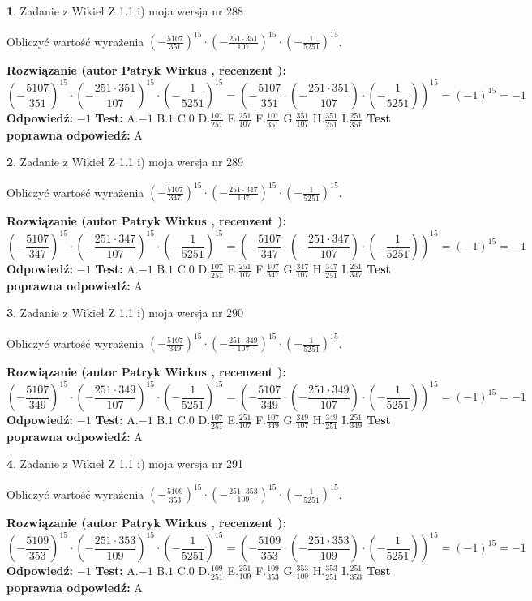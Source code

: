 \documentclass[12pt, a4paper]{article}
\theoremstyle{definition} %
\newtheorem{zad}{}
\newcommand{\zadStart}[1]{\begin{zad}#1\newline}
\newcommand{\zadStop}{\end{zad}}
\newcommand{\rozwStart}[2]{\noindent \textbf{Rozwiązanie (autor #1 , recenzent #2): }\newline}
\newcommand{\rozwStop}{\newline}
\newcommand{\odpStart}{\noindent \textbf{Odpowiedź:}\newline}
\newcommand{\odpStop}{\newline}
\newcommand{\testStart}{\noindent \textbf{Test:}\newline}
\newcommand{\testStop}{\newline}
\newcommand{\kluczStart}{\noindent \textbf{Test poprawna odpowiedź:}\newline}
\newcommand{\kluczStop}{\newline}
\begin{document}
\zadStart{Zadanie z Wikieł Z 1.1 i) moja wersja nr 288}

Obliczyć wartość wyrażenia $(-\frac{5107}{351})^{15} \cdot (-\frac{251 \cdot 351}{107})^{15} \cdot (-\frac{1}{5251})^{15}$.
\zadStop
\rozwStart{Patryk Wirkus}{}
$$(-\frac{5107}{351})^{15} \cdot (-\frac{251 \cdot 351}{107})^{15} \cdot (-\frac{1}{5251})^{15} = (-\frac{5107}{351} \cdot (-\frac{251 \cdot 351}{107}) \cdot (-\frac{1}{5251}))^{15} = (-1)^{15} = -1$$
\rozwStop
\odpStart
$-1$
\odpStop
\testStart
A.$-1$ B.$1$ C.$0$ D.$\frac{107}{251}$ E.$\frac{251}{107}$
F.$\frac{107}{351}$ G.$\frac{351}{107}$
H.$\frac{351}{251}$
I.$\frac{251}{351}$
\testStop
\kluczStart
A
\kluczStop



\zadStart{Zadanie z Wikieł Z 1.1 i) moja wersja nr 289}

Obliczyć wartość wyrażenia $(-\frac{5107}{347})^{15} \cdot (-\frac{251 \cdot 347}{107})^{15} \cdot (-\frac{1}{5251})^{15}$.
\zadStop
\rozwStart{Patryk Wirkus}{}
$$(-\frac{5107}{347})^{15} \cdot (-\frac{251 \cdot 347}{107})^{15} \cdot (-\frac{1}{5251})^{15} = (-\frac{5107}{347} \cdot (-\frac{251 \cdot 347}{107}) \cdot (-\frac{1}{5251}))^{15} = (-1)^{15} = -1$$
\rozwStop
\odpStart
$-1$
\odpStop
\testStart
A.$-1$ B.$1$ C.$0$ D.$\frac{107}{251}$ E.$\frac{251}{107}$
F.$\frac{107}{347}$ G.$\frac{347}{107}$
H.$\frac{347}{251}$
I.$\frac{251}{347}$
\testStop
\kluczStart
A
\kluczStop



\zadStart{Zadanie z Wikieł Z 1.1 i) moja wersja nr 290}

Obliczyć wartość wyrażenia $(-\frac{5107}{349})^{15} \cdot (-\frac{251 \cdot 349}{107})^{15} \cdot (-\frac{1}{5251})^{15}$.
\zadStop
\rozwStart{Patryk Wirkus}{}
$$(-\frac{5107}{349})^{15} \cdot (-\frac{251 \cdot 349}{107})^{15} \cdot (-\frac{1}{5251})^{15} = (-\frac{5107}{349} \cdot (-\frac{251 \cdot 349}{107}) \cdot (-\frac{1}{5251}))^{15} = (-1)^{15} = -1$$
\rozwStop
\odpStart
$-1$
\odpStop
\testStart
A.$-1$ B.$1$ C.$0$ D.$\frac{107}{251}$ E.$\frac{251}{107}$
F.$\frac{107}{349}$ G.$\frac{349}{107}$
H.$\frac{349}{251}$
I.$\frac{251}{349}$
\testStop
\kluczStart
A
\kluczStop



\zadStart{Zadanie z Wikieł Z 1.1 i) moja wersja nr 291}

Obliczyć wartość wyrażenia $(-\frac{5109}{353})^{15} \cdot (-\frac{251 \cdot 353}{109})^{15} \cdot (-\frac{1}{5251})^{15}$.
\zadStop
\rozwStart{Patryk Wirkus}{}
$$(-\frac{5109}{353})^{15} \cdot (-\frac{251 \cdot 353}{109})^{15} \cdot (-\frac{1}{5251})^{15} = (-\frac{5109}{353} \cdot (-\frac{251 \cdot 353}{109}) \cdot (-\frac{1}{5251}))^{15} = (-1)^{15} = -1$$
\rozwStop
\odpStart
$-1$
\odpStop
\testStart
A.$-1$ B.$1$ C.$0$ D.$\frac{109}{251}$ E.$\frac{251}{109}$
F.$\frac{109}{353}$ G.$\frac{353}{109}$
H.$\frac{353}{251}$
I.$\frac{251}{353}$
\testStop
\kluczStart
A
\kluczStop
\end{document}
